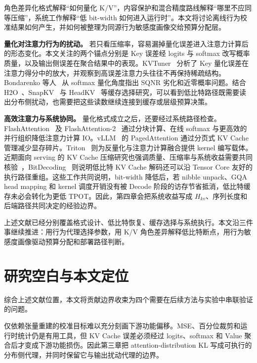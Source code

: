 角色差异化格式解释“如何量化 K/V”，内容保护和混合精度路线解释“哪里不应同等压缩”，系统工作解释“低 bit-width 如何进入运行时”。本文将讨论离线行为校准结果如何产生，并如何被整理为同源行为敏感度画像交给预算分配层。

\label{sec:ch2-quant-softmax}
\textbf{量化对注意力行为的扰动。}
若只看压缩率，容易漏掉量化误差进入注意力计算后的形态变化。本文关注的两个锚点分别是 Key 误差经 logits 与 softmax 改写概率质量，以及输出侧误差在聚合结果中的表现。KVTuner~\cite{xu2025kvtuner} 分析了 Key 量化误差在注意力得分中的放大，并观察到高误差注意力头往往不再保持稀疏结构。Bondarenko 等人~\cite{bondarenko2023softmax} 从 softmax 量化角度指出 SQNR 劣化和近零概率问题。结合 H2O~\cite{zhang2024h2o}、SnapKV~\cite{li2024snapkv} 与 HeadKV~\cite{fu2025headkv} 等缓存选择研究，可以看到低比特路径既需要读出分布侧扰动，也需要把这些读数继续连接到缓存或层级预算决策。

\textbf{高效注意力与系统协同。}
量化格式成立之后，还要经过系统路径检查。FlashAttention~\cite{dao2022flashattention} 及 FlashAttention-2~\cite{dao2024flashattention2} 通过分块计算、在线 softmax 与更高效的并行组织降低注意力计算 IO。vLLM~\cite{kwon2023vllm} 的 PagedAttention 通过分页式 KV Cache 管理减少显存碎片。Triton~\cite{tillet2019triton} 则为反量化与注意力计算融合提供 kernel 编写载体。近期面向 serving 的 KV Cache 压缩研究也强调质量、压缩率与系统收益需要共同核验~\cite{gao2025rethinkingkv}，BitDecoding~\cite{du2026bitdecoding} 则说明低比特 KV Cache 解码还可以沿 Tensor Core 友好的执行路径重组。这些工作共同说明，bit-width 降低后，若 nibble unpack、GQA head mapping 和 kernel 调度开销没有被 Decode 阶段的访存节省抵消，低比特缓存未必会转化为更低 TPOT。因此，第四章会把系统收益写成 $H_{kv}$、序列长度和后端路径共同决定的经验边界。

上述文献已经分别覆盖格式设计、低比特恢复、缓存选择与系统执行。本文沿三件事继续推进：用行为代理选择参数，用 K/V 角色差异解释低比特断点，用行为敏感度画像驱动预算分配和部署路径判断。

\section{研究空白与本文定位}

综合上述文献位置，本文将贡献边界收束为四个需要在后续方法与实验中串联验证的问题。

仅依赖张量重建的校准目标难以充分刻画下游功能偏移。MSE、百分位裁剪和运行时统计仍是有用工具，但 KV Cache 误差必须经过 logits、softmax 和 Value 聚合后才变成下游功能损伤。因此第三章把 attention-distribution KL 写成可执行的分布侧代理，并同时保留它与输出扰动代理的边界。

